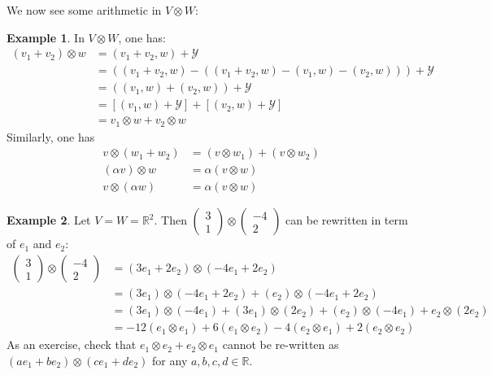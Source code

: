 \documentclass[11pt,openany]{book}
\theoremstyle{plain}
\theoremstyle{definition}
\newtheorem{example}[example]{Example}
\theoremstyle{remark}
\begin{document}
We now see some arithmetic in $V \otimes W$:
\begin{example} \label{eg-tensorarith} 
In $V \otimes W$, one has:
\begin{align*}
(v_1 + v_2) \otimes w &= (v_1 + v_2,w) + \mathcal{Y}\\
&= ((v_1 + v_2,w) - ((v_1 + v_2,w) - (v_1,w) - (v_2,w))) + \mathcal{Y} \\
&= ((v_1,w) + (v_2,w)) + \mathcal{Y}\\
&= [(v_1,w) + \mathcal{Y}] + [(v_2,w) + \mathcal{Y}]\\
&= v_1 \otimes w + v_2 \otimes w
\end{align*}
Similarly, one has
\begin{align*}
v \otimes (w_1 + w_2) &= (v \otimes w_1) + (v \otimes w_2)\\
(\alpha v) \otimes w &= \alpha (v \otimes w)\\
v \otimes (\alpha w) &= \alpha (v \otimes w)    
\end{align*}
\end{example}

\begin{example} Let $V =W = \mathbb{R}^2$. Then $\begin{pmatrix} 3\\ 1\end{pmatrix} \otimes \begin{pmatrix} -4 \\ 2 \end{pmatrix}$ can be rewritten in term of $e_1$ and $e_2$:
\begin{align*}
\begin{pmatrix} 3\\ 1\end{pmatrix} \otimes \begin{pmatrix} -4 \\ 2 \end{pmatrix} &= (3e_1 + 2e_2) \otimes (-4e_1 + 2e_2) \\
&= (3e_1) \otimes (-4e_1 + 2e_2) + (e_2) \otimes (-4e_1 + 2e_2) \\
&= (3e_1) \otimes (-4e_1) + (3e_1) \otimes (2e_2) + (e_2) \otimes (-4e_1) + e_2 \otimes (2e_2)\\
&= -12(e_1 \otimes e_1) + 6(e_1 \otimes e_2) - 4(e_2 \otimes e_1) + 2(e_2 \otimes e_2)
\end{align*}
As an exercise, check that $e_1 \otimes e_2 + e_2 \otimes e_1$ cannot be re-written as $(ae_1 + be_2) \otimes (ce_1 + de_2)$ for any $a, b, c, d \in \mathbb{R}$.
\end{example}
\end{document}
